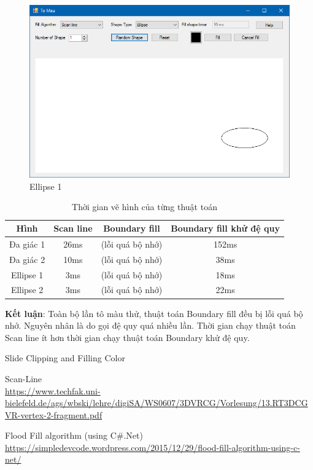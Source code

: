 \documentclass[12pt]{article}
\begin{document}
\begin{figure}[H]
\centering
\includegraphics[width=\textwidth]{images/hinh3.png}
\caption{Ellipse 1}
\end{figure}

\begin{table}[H]
\begin{tabular}{| c || c | c | c |}
\hline
Hình & Scan line & Boundary fill & Boundary fill khử đệ quy \\
\hline \hline
Đa giác 1 & 26ms & (lỗi quá bộ nhớ) & 152ms \\
\hline
Đa giác 2 & 10ms & (lỗi quá bộ nhớ) & 38ms \\
\hline
Ellipse 1 & 3ms & (lỗi quá bộ nhớ) & 18ms \\
\hline
Ellipse 2 & 3ms & (lỗi quá bộ nhớ) & 22ms \\
\hline
\end{tabular}
\caption{Thời gian vẽ hình của từng thuật toán}
\end{table}

\textbf{Kết luận}: Toàn bộ lần tô màu thử, thuật toán Boundary fill đều bị lỗi quá bộ nhớ.
Nguyên nhân là do gọi đệ quy quá nhiều lần.
Thời gian chạy thuật toán Scan line ít hơn thời gian chạy thuật toán Boundary khử đệ quy.

\begin{thebibliography}{9}

 Slide Clipping and Filling Color

 Scan-Line \\
\url{https://www.techfak.uni-bielefeld.de/ags/wbski/lehre/digiSA/WS0607/3DVRCG/Vorlesung/13.RT3DCGVR-vertex-2-fragment.pdf}

 Flood Fill algorithm (using C\#.Net) \\
\url{https://simpledevcode.wordpress.com/2015/12/29/flood-fill-algorithm-using-c-net/}

\end{thebibliography}
\end{document}
